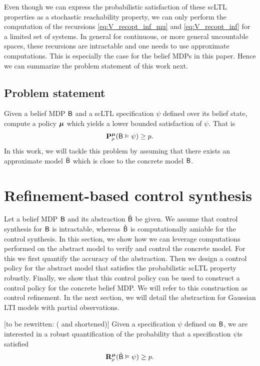 \documentclass{ifacconf}
\newcommand{\new}[1]{{\color{blue}#1}}
\begin{document}
\new{Even though we can express the probabilistic satisfaction of these scLTL properties as a stochastic reachability property, we can only perform the computation of the recursions  \eqref{eq:V_recopt_inf_mu} and \eqref{eq:V_recopt_inf}  for a limited set of systems. In general for continuous, or more general uncountable spaces, these recursions are intractable and one needs to use  approximate computations.
This is especially the case for the belief MDPs in this paper.  Hence we can summarize the problem statement of this work next.}

\subsection{Problem statement}
\new{Given a belief MDP $\mathsf{B}$ and a scLTL specification $\psi$ defined over its belief state, compute a policy ${\boldsymbol{\mu}}$ which yields a lower bounded satisfaction of $\psi$. That is 
\begin{align}
 \mathbf{P}_\rho^{\boldsymbol{\mu}}(\mathsf{B}\vDash\psi)\geq p.
\end{align}
In this work, we will tackle this problem by assuming that there exists an approximate model $\tilde {\mathsf{B}}$ which is close to the concrete model $\mathsf{B}$.

}




\section{Refinement-based control synthesis} \label{sec:refinement}
\new{ Let a belief MDP $\mathsf{B}$ and its abstraction $\tilde {\mathsf{B}}$ be given.  
We assume that control synthesis for $\mathsf{B}$ is intractable, whereas $\tilde {\mathsf{B}}$ is computationally amiable for the control synthesis.
In this section, we show  how we can leverage computations performed on the abstract model to verify and control the concrete model. For this we first quantify the accuracy of the abstraction. Then we design a control policy for the abstract model that satisfies the probabilistic scLTL property robustly. Finally, we show that this control policy can be used to construct a control policy for the concrete belief MDP. We will refer to this construction as control refinement. In the next section, we will detail the abstraction for Gaussian  LTI models with partial observations.}


\color{orange} [to be rewritten: ( and shortened)]
Given a specification $\psi$ defined on $\mathsf{B}$, we are interested in a robust quantification of the probability that a specification $\psi$is satisfied 
 \begin{align}
 \mathbf R _\rho^{\boldsymbol{\mu}}(\tilde {\mathsf{B}}\vDash\psi)\geq p.
\end{align}
\end{document}
